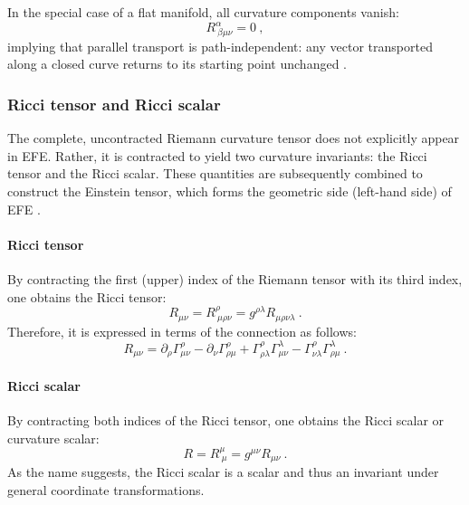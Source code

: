 In the special case of a flat manifold, all curvature components vanish:
\begin{equation}
R^{\alpha}_{\ \beta\mu\nu} = 0 \ ,
\end{equation}
implying that parallel transport is path-independent: any vector transported along a closed curve returns to its starting point unchanged \cite{riemanntensorproperties}.

\subsubsection{Ricci tensor and Ricci scalar}

The complete, uncontracted Riemann curvature tensor does not explicitly appear in EFE. Rather, it is contracted to yield two curvature invariants: the Ricci tensor and the Ricci scalar. These quantities are subsequently combined to construct the Einstein tensor, which forms the geometric side (left-hand side) of EFE \cite{Llibre_Peter_Collier_unacosadificildecomprender}.


\paragraph{Ricci tensor}

By contracting the first (upper) index of the Riemann tensor with its third index, one obtains the Ricci tensor:
\begin{equation}
R_{\mu\nu} = R_{\ \mu\rho\nu}^{\rho} = g^{\rho\lambda} R_{\mu\rho\nu\lambda} \ .
\end{equation}
Therefore, it is expressed in terms of the connection as follows:
\begin{equation}
R_{\mu\nu} = \partial_{\rho} \Gamma^{\rho}_{\mu\nu} - \partial_{\nu} \Gamma^{\rho}_{\rho\mu} + \Gamma^{\rho}_{\rho\lambda} \Gamma^{\lambda}_{\mu\nu} - \Gamma^{\rho}_{\nu\lambda} \Gamma^{\lambda}_{\rho\mu} \ .
\end{equation}


\paragraph{Ricci scalar}

By contracting both indices of the Ricci tensor, one obtains the Ricci scalar or curvature scalar:
\begin{equation}
R = R_{\ \mu}^{\mu} = g^{\mu\nu} R_{\mu\nu} \ .
\end{equation}
As the name suggests, the Ricci scalar is a scalar and thus an invariant under general coordinate transformations.


